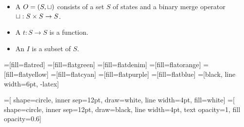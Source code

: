 \begin{itemize}
  \item
    A  $O = (S, \sqcup)$ consists of a set $S$ of
    states and a binary merge operator $\sqcup: S \times S \to S$.
  \item
    A  $t: S \to S$ is a function.
  \item
    An  $I$ is a subset of $S$.
\end{itemize}

=[fill=flatred]
=[fill=flatgreen]
=[fill=flatdenim]
=[fill=flatorange]
=[fill=flatyellow]
=[fill=flatcyan]
=[fill=flatpurple]
=[fill=flatblue]
=[black, line width=6pt, -latex]

\newcommand{\internaltext}[1]{$\boldsymbol #1$}

=[%
  shape=circle, inner sep=12pt, draw=white, line width=4pt, fill=white]
=[%
  shape=circle, inner sep=12pt, draw=black, line width=4pt, text opacity=1,
  fill opacity=0.6]

